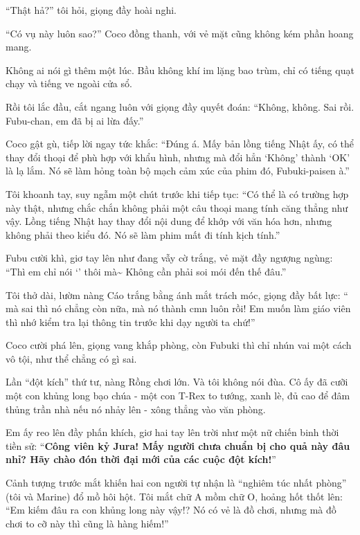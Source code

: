 \documentclass[../main.tex]{subfiles}
\begin{document}
``Thật hả?'' tôi hỏi, giọng đầy hoài nghi.

``Có vụ này luôn sao?'' Coco đồng thanh, với vẻ mặt cũng không kém phần hoang mang.

Không ai nói gì thêm một lúc. Bầu không khí im lặng bao trùm, chỉ có tiếng quạt chạy và tiếng ve ngoài cửa sổ.

Rồi tôi lắc đầu, cắt ngang luôn với giọng đầy quyết đoán: ``Không, không. Sai rồi. Fubu-chan, em đã bị ai lừa đấy.''

Coco gật gù, tiếp lời ngay tức khắc: ``Đúng á. Mấy bản lồng tiếng Nhật ấy, có thể thay đổi thoại để phù hợp với khẩu hình, nhưng mà đổi hẳn `Không' thành `OK' là lạ lắm. Nó sẽ làm hỏng toàn bộ mạch cảm xúc của phim đó, Fubuki-paisen à.''

Tôi khoanh tay, suy ngẫm một chút trước khi tiếp tục: ``Có thể là có trường hợp này thật, nhưng chắc chắn không phải một câu thoại mang tính căng thẳng như vậy. Lồng tiếng Nhật hay thay đổi nội dung để khớp với văn hóa hơn, nhưng không phải theo kiểu đó. Nó sẽ làm phim mất đi tính kịch tính.''

Fubu cười khì, giơ tay lên như đang vẫy cờ trắng, vẻ mặt đầy ngượng ngùng: ``Thì em chỉ nói `' thôi mà\~{} Không cần phải soi mói đến thế đâu.''

Tôi thở dài, lườm nàng Cáo trắng bằng ánh mắt trách móc, giọng đầy bất lực: `` mà sai thì nó chẳng còn  nữa, mà nó thành  cmn luôn rồi! Em muốn làm giáo viên thì nhớ kiểm tra lại thông tin trước khi dạy người ta chứ!''

Coco cười phá lên, giọng vang khắp phòng, còn Fubuki thì chỉ nhún vai một cách vô tội, như thể chẳng có gì sai.

\il

\ct

Lần ``đột kích'' thứ tư, nàng Rồng chơi lớn. Và tôi không nói đùa. Cô ấy đã cưỡi một con khủng long bạo chúa - một con T-Rex to tướng, xanh lè, đủ cao để đâm thủng trần nhà nếu nó nhảy lên - xông thẳng vào văn phòng.


Em ấy reo lên đầy phấn khích, giơ hai tay lên trời như một nữ chiến binh thời tiền sử: ``\textbf{Công viên kỷ Jura! Mấy người chưa chuẩn bị cho quả này đâu nhỉ? Hãy chào đón thời đại mới của các cuộc đột kích!}''

Cảnh tượng trước mắt khiến hai con người tự nhận là ``nghiêm túc nhất phòng'' (tôi và Marine) đổ mồ hôi hột. Tôi mắt chữ A mồm chữ O, hoảng hốt thốt lên: ``Em kiếm đâu ra con khủng long này vậy!? Nó có vẻ là đồ chơi, nhưng mà đồ chơi to cỡ này thì cũng là hàng hiếm!''
\end{document}
